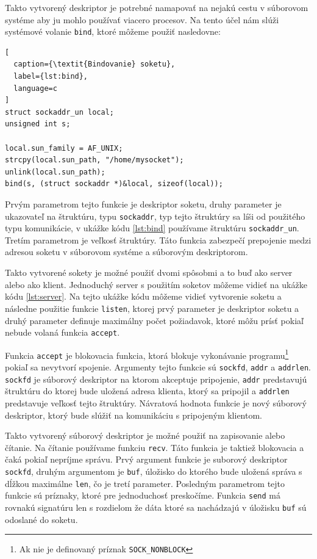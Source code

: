 Takto vytvorený deskriptor je potrebné namapovať na nejakú cestu v súborovom systéme aby ju mohlo používať viacero procesov. Na tento účel nám slúži systémové volanie \texttt{bind}, ktoré môžeme použiť nasledovne:
\begin{lstlisting}[
  caption={\textit{Bindovanie} soketu},
  label={lst:bind},
  language=c
]
struct sockaddr_un local;
unsigned int s;

local.sun_family = AF_UNIX;
strcpy(local.sun_path, "/home/mysocket");
unlink(local.sun_path);
bind(s, (struct sockaddr *)&local, sizeof(local));
\end{lstlisting}
Prvým parametrom tejto funkcie je deskriptor soketu, druhy parameter je ukazovateľ na štruktúru, typu \texttt{sockaddr}, typ tejto štruktúry sa líši od použitého typu komunikácie, v ukážke kódu \ref{lst:bind} používame štruktúru \texttt{sockaddr\_un}. Tretím parametrom je veľkosť štruktúry. Táto funkcia zabezpečí prepojenie medzi adresou soketu v súborovom systéme a súborovým deskriptorom.

Takto vytvorené sokety je možné použiť dvomi spôsobmi a to buď ako server alebo ako klient. 
Jednoduchý server s použitím soketov môžeme vidieť na ukážke kódu \ref{lst:server}. Na tejto ukážke kódu môžeme vidieť vytvorenie soketu a následne použitie funkcie \texttt{listen}, ktorej prvý parameter je deskriptor soketu a druhý parameter definuje maximálny počet požiadavok, ktoré môžu prísť pokiaľ nebude volaná funkcia \texttt{accept}. 

Funkcia \texttt{accept} je blokovacia funkcia, ktorá blokuje vykonávanie programu\footnote{Ak nie je definovaný príznak \texttt{SOCK\_NONBLOCK}} pokiaľ sa nevytvorí spojenie. Argumenty tejto funkcie sú \texttt{sockfd}, \texttt{addr} a \texttt{addrlen}. \texttt{sockfd} je súborový deskriptor na ktorom akceptuje pripojenie, \texttt{addr} predstavujú štruktúru do ktorej bude uložená adresa klienta, ktorý sa pripojil a \texttt{addrlen} predstavuje veľkosť tejto štruktúry. Návratová hodnota funkcie je nový súborový deskriptor, ktorý bude slúžiť na komunikáciu s pripojeným klientom. 

Takto vytvorený súborový deskriptor je možné použiť na zapisovanie alebo čítanie. Na čítanie používame funkciu \texttt{recv}. Táto funkcia je taktiež blokovacia a čaká pokiaľ nepríjme správu. Prvý argument funkcie je suborový deskriptor \texttt{sockfd}, druhým argumentom je \texttt{buf}, úložisko do ktorého bude uložená správa s dĺžkou maximálne \texttt{len}, čo je tretí parameter. Posledným parametrom tejto funkcie sú príznaky, ktoré pre jednoduchosť preskočíme. Funkcia \texttt{send} má rovnakú signatúru len s rozdielom že dáta ktoré sa nachádzajú v úložisku \texttt{buf} sú odoslané do soketu.

